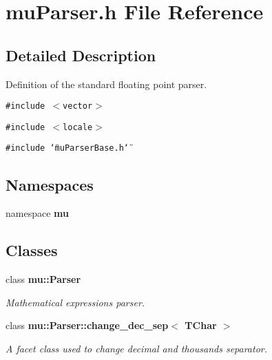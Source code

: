 \section{muParser.h File Reference}
\label{muParser_8h}


\subsection{Detailed Description}
Definition of the standard floating point parser. 



{\tt \#include $<$vector$>$}\par
{\tt \#include $<$locale$>$}\par
{\tt \#include \char`\"{}muParserBase.h\char`\"{}}\par
\subsection*{Namespaces}
\begin{CompactItemize}
\item 
namespace {\bf mu}
\end{CompactItemize}
\subsection*{Classes}
\begin{CompactItemize}
\item 
class {\bf mu::Parser}
\begin{CompactList}\small\item\em Mathematical expressions parser. \item\end{CompactList}\item 
class \textbf{mu::Parser::change\_\-dec\_\-sep$<$ TChar $>$}
\begin{CompactList}\small\item\em A facet class used to change decimal and thousands separator. \item\end{CompactList}\end{CompactItemize}
